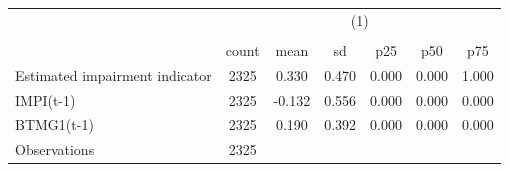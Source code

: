 {
\def\sym#1{\ifmmode^{#1}\else\(^{#1}\)\fi}
\begin{tabular}{l*{1}{cccccc}}
\hline\hline
                    &\multicolumn{6}{c}{(1)}                                                      \\
                    &\multicolumn{6}{c}{}                                                         \\
                    &       count&        mean&          sd&         p25&         p50&         p75\\
\hline
Estimated impairment indicator&        2325&       0.330&       0.470&       0.000&       0.000&       1.000\\
IMPI(t-1)           &        2325&      -0.132&       0.556&       0.000&       0.000&       0.000\\
BTMG1(t-1)          &        2325&       0.190&       0.392&       0.000&       0.000&       0.000\\
\hline
Observations        &        2325&            &            &            &            &            \\
\hline\hline
\end{tabular}
}
